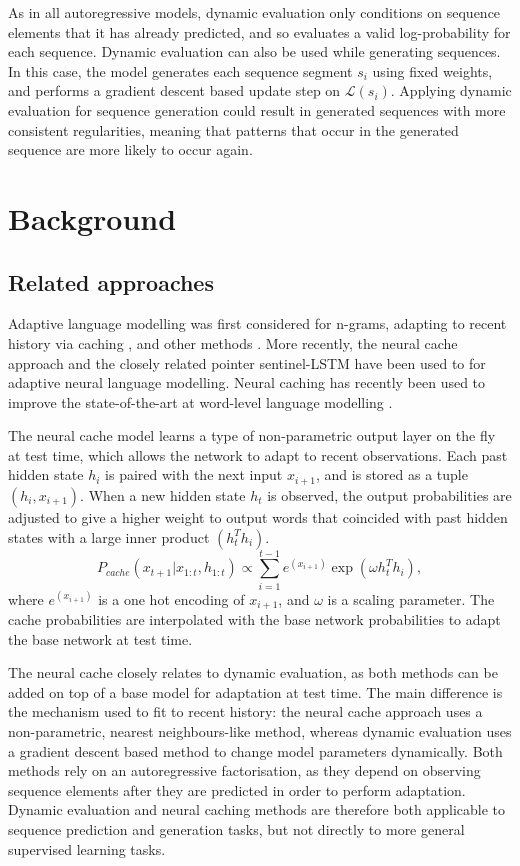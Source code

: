 \documentclass{article} \usepackage{iclr2018_conference,times}
\begin{document}
As in all autoregressive models, dynamic evaluation only conditions on sequence elements that it has already predicted, and so evaluates a valid log-probability for each sequence. Dynamic evaluation can also be used while generating sequences. In this case, the model generates each sequence segment $s_i$ using fixed weights, and performs a gradient descent based update step on $\mathcal{L}(s_i)$. Applying dynamic evaluation for sequence generation could result in generated sequences with more consistent regularities, meaning that patterns that occur in the generated sequence are more likely to occur again.


\section{Background}

\subsection{Related approaches}

Adaptive language modelling was first considered for n-grams, adapting to recent history via caching \citep{jelinek1991,kuhn1988}, and other methods \citet{bellegarda2004adaptation}. More recently, the neural cache approach \citep{grave2017} and the closely related pointer sentinel-LSTM \citep{Merity2016} have been used to for adaptive neural language modelling. Neural caching has recently been used to improve the state-of-the-art at word-level language modelling \citep{merity2017}.

The neural cache model learns a type of non-parametric output layer on the fly at test time, which allows the network to adapt to recent observations. Each past hidden state $h_i$ is paired with the next input $x_{i+1}$, and is stored as a tuple $(h_i,x_{i+1})$. When a new hidden state $h_t$ is observed, the output probabilities are adjusted to give a higher weight to output words that coincided with past hidden states with a large inner product $(h_t^T h_i)$. 
\begin{equation}
P_{cache}(x_{t+1}|x_{1:t},h_{1:t})  \propto \sum^{t-1}_{i=1} e^{(x_{i+1})} \exp(\omega h_t^T h_i),
\end{equation}
where $e^{(x_{i+1})}$ is a one hot encoding of $x_{i+1}$, and $\omega$ is a scaling parameter. The cache probabilities are interpolated with the base network probabilities to adapt the base network at test time.

The neural cache closely relates to dynamic evaluation, as both methods can be added on top of a base model for adaptation at test time. The main difference is the mechanism used to fit to recent history: the neural cache approach uses a non-parametric, nearest neighbours-like method, whereas dynamic evaluation uses a gradient descent based method to change model parameters dynamically. Both methods rely on an autoregressive factorisation, as they depend on observing sequence elements after they are predicted in order to perform adaptation. Dynamic evaluation and neural caching methods are therefore both applicable to sequence prediction and generation tasks, but not directly to more general supervised learning tasks.
\end{document}
